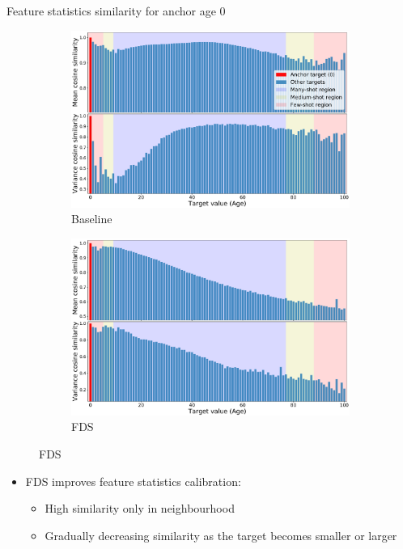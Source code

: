 
\begin{frame}{Feature statistics similarity for anchor age 0}
	\begin{figure}[h]
		\begin{subfigure}{0.48\textwidth}
			\includegraphics[width=\linewidth]{images/feat_sim_fds_base_0.pdf}
			\caption{Baseline}
		\end{subfigure}\hspace{1em}%
		\begin{subfigure}{0.48\textwidth}
			\includegraphics[width=\linewidth]{images/feat_sim_fds_ours_0.pdf}
			\caption{FDS}
		\end{subfigure}
	\end{figure}
	\begin{itemize}
		\item FDS improves feature statistics calibration:
		\begin{itemize}
			\item High similarity only in neighbourhood
			\item Gradually decreasing similarity as the target becomes smaller or larger
		\end{itemize}
	\end{itemize}
\end{frame}


